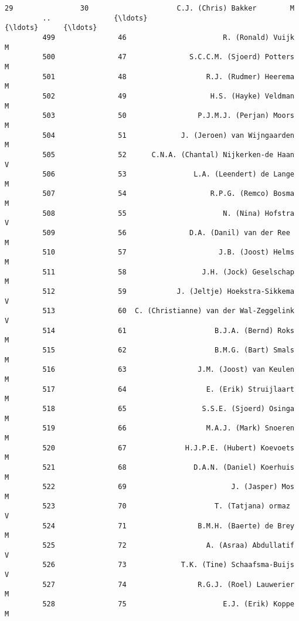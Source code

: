 \documentclass{article}
\begin{document}
\begin{Verbatim}[commandchars=\\\{\}]
         29                30                     C.J. (Chris) Bakker        M   
         ..               {\ldots}                                     {\ldots}      {\ldots}   
         499               46                       R. (Ronald) Vuijk        M   
         500               47               S.C.C.M. (Sjoerd) Potters        M   
         501               48                   R.J. (Rudmer) Heerema        M   
         502               49                    H.S. (Hayke) Veldman        M   
         503               50                 P.J.M.J. (Perjan) Moors        M   
         504               51             J. (Jeroen) van Wijngaarden        M   
         505               52      C.N.A. (Chantal) Nijkerken-de Haan        V   
         506               53                L.A. (Leendert) de Lange        M   
         507               54                    R.P.G. (Remco) Bosma        M   
         508               55                       N. (Nina) Hofstra        V   
         509               56               D.A. (Danil) van der Ree        M   
         510               57                      J.B. (Joost) Helms        M   
         511               58                  J.H. (Jock) Geselschap        M   
         512               59            J. (Jeltje) Hoekstra-Sikkema        V   
         513               60  C. (Christianne) van der Wal-Zeggelink        V   
         514               61                     B.J.A. (Bernd) Roks        M   
         515               62                     B.M.G. (Bart) Smals        M   
         516               63                 J.M. (Joost) van Keulen        M   
         517               64                   E. (Erik) Struijlaart        M   
         518               65                  S.S.E. (Sjoerd) Osinga        M   
         519               66                   M.A.J. (Mark) Snoeren        M   
         520               67              H.J.P.E. (Hubert) Koevoets        M   
         521               68                D.A.N. (Daniel) Koerhuis        M   
         522               69                         J. (Jasper) Mos        M   
         523               70                     T. (Tatjana) ormaz        V   
         524               71                 B.M.H. (Baerte) de Brey        M   
         525               72                   A. (Asraa) Abdullatif        V   
         526               73             T.K. (Tine) Schaafsma-Buijs        V   
         527               74                 R.G.J. (Roel) Lauwerier        M   
         528               75                       E.J. (Erik) Koppe        M   
         

\end{Verbatim}
\end{document}
